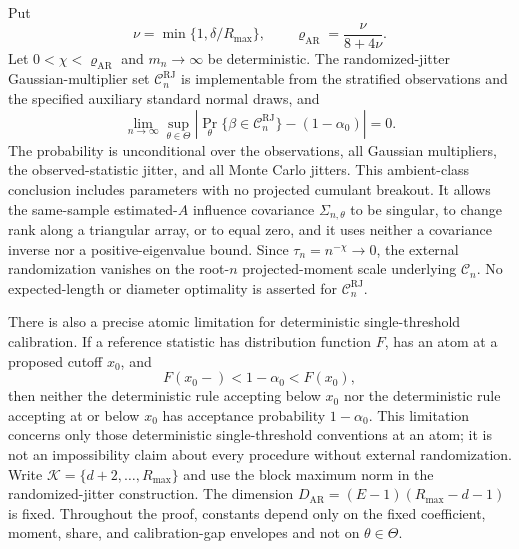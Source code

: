 Put
\[
 \nu=\min\{1,\delta/R_{\max}\},
 \qquad
 \varrho_{\mathrm{AR}}=\frac{\nu}{8+4\nu}.
\]
Let \(0<\chi<\varrho_{\mathrm{AR}}\) and \(m_n\to\infty\) be deterministic.  The randomized-jitter Gaussian-multiplier set \(\mathcal C_n^{\mathrm{RJ}}\) is implementable from the stratified observations and the specified auxiliary standard normal draws, and
\[
 \lim_{n\to\infty}
 \sup_{\theta\in\Theta}
 \left|
 \Pr_\theta\{\beta\in\mathcal C_n^{\mathrm{RJ}}\}
 -(1-\alpha_0)
 \right|=0.
\]
The probability is unconditional over the observations, all Gaussian multipliers, the observed-statistic jitter, and all Monte Carlo jitters.  This ambient-class conclusion includes parameters with no projected cumulant breakout.  It allows the same-sample estimated-\(A\) influence covariance \(\Sigma_{n,\theta}\) to be singular, to change rank along a triangular array, or to equal zero, and it uses neither a covariance inverse nor a positive-eigenvalue bound.  Since \(\tau_n=n^{-\chi}\to0\), the external randomization vanishes on the root-\(n\) projected-moment scale underlying \(\mathcal C_n\).  No expected-length or diameter optimality is asserted for \(\mathcal C_n^{\mathrm{RJ}}\).

There is also a precise atomic limitation for deterministic single-threshold calibration.  If a reference statistic has distribution function \(F\), has an atom at a proposed cutoff \(x_0\), and
\[
 F(x_0-)<1-\alpha_0<F(x_0),
\]
then neither the deterministic rule accepting below \(x_0\) nor the deterministic rule accepting at or below \(x_0\) has acceptance probability \(1-\alpha_0\).  This limitation concerns only those deterministic single-threshold conventions at an atom; it is not an impossibility claim about every procedure without external randomization.
Write \(\mathcal K=\{d+2,\ldots,R_{\max}\}\) and use the block maximum norm in the randomized-jitter construction.  The dimension \(D_{\mathrm{AR}}=(E-1)(R_{\max}-d-1)\) is fixed.  Throughout the proof, constants depend only on the fixed coefficient, moment, share, and calibration-gap envelopes and not on \(\theta\in\Theta\).

